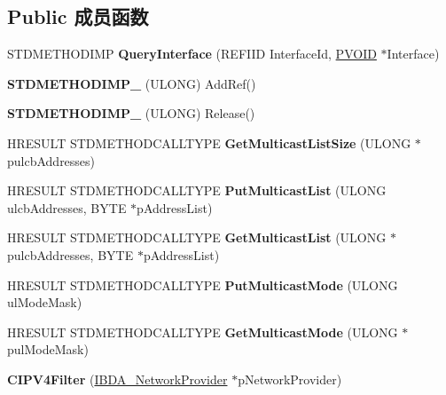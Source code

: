 \subsection*{Public 成员函数}
\begin{DoxyCompactItemize}
\item 
\mbox{\label{class_c_i_p_v4_filter_a00d6b272f724ed86cd333b0f73c6b314}} 
S\+T\+D\+M\+E\+T\+H\+O\+D\+I\+MP {\bfseries Query\+Interface} (R\+E\+F\+I\+ID Interface\+Id, \hyperlink{interfacevoid}{P\+V\+O\+ID} $\ast$Interface)
\item 
\mbox{\label{class_c_i_p_v4_filter_acbd449620ac2441742910aa8994b5635}} 
{\bfseries S\+T\+D\+M\+E\+T\+H\+O\+D\+I\+M\+P\+\_\+} (U\+L\+O\+NG) Add\+Ref()
\item 
\mbox{\label{class_c_i_p_v4_filter_a2bd8b21eb2345874b2be4a4f805a01b6}} 
{\bfseries S\+T\+D\+M\+E\+T\+H\+O\+D\+I\+M\+P\+\_\+} (U\+L\+O\+NG) Release()
\item 
\mbox{\label{class_c_i_p_v4_filter_a68295325ab91a80a8716841d28c3540d}} 
H\+R\+E\+S\+U\+LT S\+T\+D\+M\+E\+T\+H\+O\+D\+C\+A\+L\+L\+T\+Y\+PE {\bfseries Get\+Multicast\+List\+Size} (U\+L\+O\+NG $\ast$pulcb\+Addresses)
\item 
\mbox{\label{class_c_i_p_v4_filter_a4d341cb17f00c3861b6141fa24e73db2}} 
H\+R\+E\+S\+U\+LT S\+T\+D\+M\+E\+T\+H\+O\+D\+C\+A\+L\+L\+T\+Y\+PE {\bfseries Put\+Multicast\+List} (U\+L\+O\+NG ulcb\+Addresses, B\+Y\+TE $\ast$p\+Address\+List)
\item 
\mbox{\label{class_c_i_p_v4_filter_a495cc39e7b3036cab5507a87603824bf}} 
H\+R\+E\+S\+U\+LT S\+T\+D\+M\+E\+T\+H\+O\+D\+C\+A\+L\+L\+T\+Y\+PE {\bfseries Get\+Multicast\+List} (U\+L\+O\+NG $\ast$pulcb\+Addresses, B\+Y\+TE $\ast$p\+Address\+List)
\item 
\mbox{\label{class_c_i_p_v4_filter_a1252d1896fb568e5cac1670380af4160}} 
H\+R\+E\+S\+U\+LT S\+T\+D\+M\+E\+T\+H\+O\+D\+C\+A\+L\+L\+T\+Y\+PE {\bfseries Put\+Multicast\+Mode} (U\+L\+O\+NG ul\+Mode\+Mask)
\item 
\mbox{\label{class_c_i_p_v4_filter_a1b276f5f90ecfe21bfc2b3d6967d33bb}} 
H\+R\+E\+S\+U\+LT S\+T\+D\+M\+E\+T\+H\+O\+D\+C\+A\+L\+L\+T\+Y\+PE {\bfseries Get\+Multicast\+Mode} (U\+L\+O\+NG $\ast$pul\+Mode\+Mask)
\item 
\mbox{\label{class_c_i_p_v4_filter_ae7625958d2ee645cfb0e8c0be70482ef}} 
{\bfseries C\+I\+P\+V4\+Filter} (\hyperlink{interface_i_b_d_a___network_provider}{I\+B\+D\+A\+\_\+\+Network\+Provider} $\ast$p\+Network\+Provider)
\end{DoxyCompactItemize}

